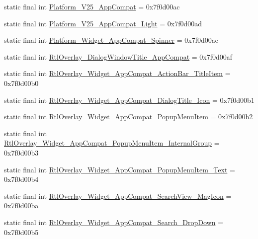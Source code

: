 \begin{DoxyCompactItemize}
static final int \mbox{\hyperlink{classandroid_1_1support_1_1design_1_1_r_1_1style_a284efe44537e37f4ce10bd6560537fcb}{Platform\+\_\+\+V25\+\_\+\+App\+Compat}} = 0x7f0d00ac
\item 
static final int \mbox{\hyperlink{classandroid_1_1support_1_1design_1_1_r_1_1style_a6d9bacc24798fbed1801933f6281fb34}{Platform\+\_\+\+V25\+\_\+\+App\+Compat\+\_\+\+Light}} = 0x7f0d00ad
\item 
static final int \mbox{\hyperlink{classandroid_1_1support_1_1design_1_1_r_1_1style_a4023bb1017cc57b6f31dd09e187377e9}{Platform\+\_\+\+Widget\+\_\+\+App\+Compat\+\_\+\+Spinner}} = 0x7f0d00ae
\item 
static final int \mbox{\hyperlink{classandroid_1_1support_1_1design_1_1_r_1_1style_abb7a1569de346ab246bb77f817bd1ce9}{Rtl\+Overlay\+\_\+\+Dialog\+Window\+Title\+\_\+\+App\+Compat}} = 0x7f0d00af
\item 
static final int \mbox{\hyperlink{classandroid_1_1support_1_1design_1_1_r_1_1style_ae25aaafa59260a6b79ec287a3beb1a39}{Rtl\+Overlay\+\_\+\+Widget\+\_\+\+App\+Compat\+\_\+\+Action\+Bar\+\_\+\+Title\+Item}} = 0x7f0d00b0
\item 
static final int \mbox{\hyperlink{classandroid_1_1support_1_1design_1_1_r_1_1style_a0246a2939405f0f3a9d2297f3a9af4af}{Rtl\+Overlay\+\_\+\+Widget\+\_\+\+App\+Compat\+\_\+\+Dialog\+Title\+\_\+\+Icon}} = 0x7f0d00b1
\item 
static final int \mbox{\hyperlink{classandroid_1_1support_1_1design_1_1_r_1_1style_aa3c7b42ba6b7b9c67911c84bc40539c0}{Rtl\+Overlay\+\_\+\+Widget\+\_\+\+App\+Compat\+\_\+\+Popup\+Menu\+Item}} = 0x7f0d00b2
\item 
static final int \mbox{\hyperlink{classandroid_1_1support_1_1design_1_1_r_1_1style_ad71265267679035bf7edd1e400e3dd35}{Rtl\+Overlay\+\_\+\+Widget\+\_\+\+App\+Compat\+\_\+\+Popup\+Menu\+Item\+\_\+\+Internal\+Group}} = 0x7f0d00b3
\item 
static final int \mbox{\hyperlink{classandroid_1_1support_1_1design_1_1_r_1_1style_ad1d99892921697cf4b200f1460ef494b}{Rtl\+Overlay\+\_\+\+Widget\+\_\+\+App\+Compat\+\_\+\+Popup\+Menu\+Item\+\_\+\+Text}} = 0x7f0d00b4
\item 
static final int \mbox{\hyperlink{classandroid_1_1support_1_1design_1_1_r_1_1style_ab4feb2c6d3b2235377bd63bfd6ccdbae}{Rtl\+Overlay\+\_\+\+Widget\+\_\+\+App\+Compat\+\_\+\+Search\+View\+\_\+\+Mag\+Icon}} = 0x7f0d00ba
\item 
static final int \mbox{\hyperlink{classandroid_1_1support_1_1design_1_1_r_1_1style_ad641028a3298caa7cb319dba54de145d}{Rtl\+Overlay\+\_\+\+Widget\+\_\+\+App\+Compat\+\_\+\+Search\+\_\+\+Drop\+Down}} = 0x7f0d00b5

\end{DoxyCompactItemize}
